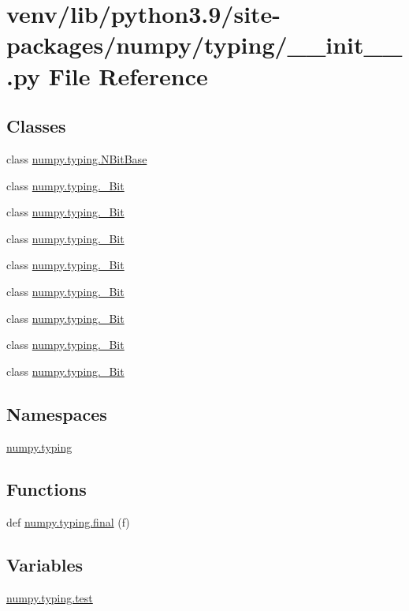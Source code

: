 \hypertarget{venv_2lib_2python3_89_2site-packages_2numpy_2typing_2____init_____8py}{}\section{venv/lib/python3.9/site-\/packages/numpy/typing/\+\_\+\+\_\+init\+\_\+\+\_\+.py File Reference}
\label{venv_2lib_2python3_89_2site-packages_2numpy_2typing_2____init_____8py}
\subsection*{Classes}
\begin{DoxyCompactItemize}
\item 
class \hyperlink{classnumpy_1_1typing_1_1NBitBase}{numpy.\+typing.\+N\+Bit\+Base}
\item 
class \hyperlink{classnumpy_1_1typing_1_1__256Bit}{numpy.\+typing.\+\_\+Bit}
\item 
class \hyperlink{classnumpy_1_1typing_1_1__128Bit}{numpy.\+typing.\+\_\+Bit}
\item 
class \hyperlink{classnumpy_1_1typing_1_1__96Bit}{numpy.\+typing.\+\_\+Bit}
\item 
class \hyperlink{classnumpy_1_1typing_1_1__80Bit}{numpy.\+typing.\+\_\+Bit}
\item 
class \hyperlink{classnumpy_1_1typing_1_1__64Bit}{numpy.\+typing.\+\_\+Bit}
\item 
class \hyperlink{classnumpy_1_1typing_1_1__32Bit}{numpy.\+typing.\+\_\+Bit}
\item 
class \hyperlink{classnumpy_1_1typing_1_1__16Bit}{numpy.\+typing.\+\_\+Bit}
\item 
class \hyperlink{classnumpy_1_1typing_1_1__8Bit}{numpy.\+typing.\+\_\+Bit}
\end{DoxyCompactItemize}
\subsection*{Namespaces}
\begin{DoxyCompactItemize}
\item 
 \hyperlink{namespacenumpy_1_1typing}{numpy.\+typing}
\end{DoxyCompactItemize}
\subsection*{Functions}
\begin{DoxyCompactItemize}
\item 
def \hyperlink{namespacenumpy_1_1typing_ae5318a3c44e5bcc959a32b1436f7d65a}{numpy.\+typing.\+final} (f)
\end{DoxyCompactItemize}
\subsection*{Variables}
\begin{DoxyCompactItemize}
\item 
\hyperlink{namespacenumpy_1_1typing_ae85ceb6b665f510f0a3010e781ac12c4}{numpy.\+typing.\+test}
\end{DoxyCompactItemize}
